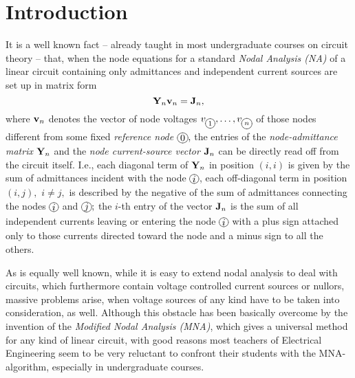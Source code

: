 \documentclass[10pt,journal,twocolumn,pagenumbers]{IEEEtran}
\begin{document}
\section{Introduction}
\noindent 
It is a well known fact -- already taught in most undergraduate courses on circuit theory \cite{Balabanian} -- that,
when the node equations for a standard {\sl Nodal Analysis (NA)} of a linear circuit containing only admittances and independent current sources are set up in matrix form
\begin{equation*}
{\bf Y}_n {\bf v}_n = {\bf J}_n,
\end{equation*}
where ${\bf v}_n$ denotes the vector of node voltages $v_{\xy*+{\scriptstyle{1}}*\cir{}\endxy},\dots,v_{\xy*+{\scriptstyle{n}}*\cir{}\endxy}$ of those nodes different from some fixed {\em reference node} ${\xy*+{0}*\cir{}\endxy},$ 
the entries of the {\em node-admittance matrix} ${\bf Y}_n$ and the {\em node current-source vector} ${\bf J}_n$ can be directly read off from the circuit itself. I.e., each diagonal term of  ${\bf Y}_n$ in position $(i,i)$ is given by the sum of admittances incident with the node ${\xy*+{i}*\cir{}\endxy}$, each off-diagonal term in position $(i,j),$ $i\ne j,$ is described by the negative of the sum of admittances connecting the nodes ${\xy*+{i}*\cir{}\endxy}$ and ${\xy*+{j}*\cir{}\endxy};$ the $i$-th entry of the vector ${\bf J}_n$ is the sum of all independent currents leaving or entering the node ${\xy*+{i}*\cir{}\endxy}$ with a plus sign attached only to those currents directed toward the node and a minus sign to all the others.

As is equally well known, while it is easy to extend nodal analysis to deal with circuits, which furthermore contain voltage controlled current sources or nullors, massive problems arise, when voltage sources of any kind have to be taken into consideration, as well. Although this obstacle has been basically overcome by the invention of the {\sl Modified Nodal Analysis (MNA)}, which gives a universal method for any kind of linear circuit, with good reasons most teachers of Electrical Engineering seem to be very reluctant to confront their students with the MNA-algorithm, especially in undergraduate courses.   
\end{document}
